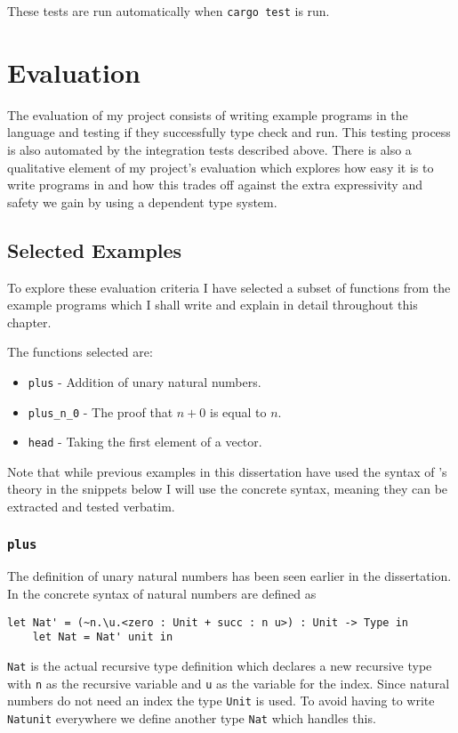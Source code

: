 \documentclass[12pt,a4paper,twoside]{report}
\begin{document}
These tests are run automatically when \texttt{cargo test} is run.

\chapter{Evaluation}

The evaluation of my project consists of writing example programs in the \pimu{} language and testing if they successfully type check and run.
This testing process is also automated by the integration tests described above.
There is also a qualitative element of my project's evaluation which explores how easy it is to write programs in \pimu{} and how this trades off against the extra expressivity and safety we gain by using a dependent type system.

\section{Selected Examples}

To explore these evaluation criteria I have selected a subset of functions from the example programs which I shall write and explain in detail throughout this chapter.

The functions selected are:
\begin{itemize}
    \item \texttt{plus} - Addition of unary natural numbers.
    \item \texttt{plus\_n\_0} - The proof that \(n + 0\) is equal to \(n\).
    \item \texttt{head} - Taking the first element of a vector.
\end{itemize}

Note that while previous examples in this dissertation have used the syntax of \pimu{}'s theory in the snippets below I will use the concrete syntax, meaning they can be extracted and tested verbatim.

\subsection{\texttt{plus}}

The definition of unary natural numbers has been seen earlier in the dissertation.
In the concrete syntax of \pimu{} natural numbers are defined as
\begin{lstlisting}[gobble=4]
    let Nat' = (~n.\u.<zero : Unit + succ : n u>) : Unit -> Type in
    let Nat = Nat' unit in
\end{lstlisting}
\texttt{Nat\textquotesingle} is the actual recursive type definition which declares a new recursive type with \texttt{n} as the recursive variable and \texttt{u} as the variable for the index.
Since natural numbers do not need an index the type \texttt{Unit} is used.
To avoid having to write \texttt{Nat\textquotesingle unit} everywhere we define another type \texttt{Nat} which handles this.
\end{document}
